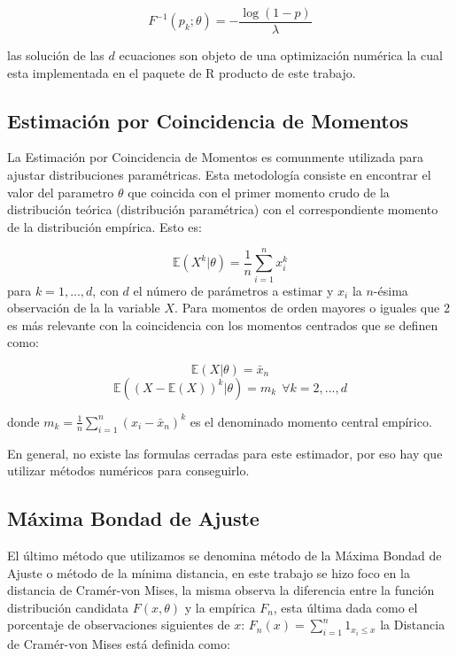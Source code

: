 \documentclass[10pt,]{article}
\begin{document}
\[F^{-1}(p_k;\theta)=-\frac{\log(1-p)}{\lambda}\]

las solución de las \(d\) ecuaciones son objeto de una optimización
numérica la cual esta implementada en el paquete de R producto de este
trabajo.

\hypertarget{estimacion-por-coincidencia-de-momentos}{%
\subsection{Estimación por Coincidencia de
Momentos}\label{estimacion-por-coincidencia-de-momentos}}

La Estimación por Coincidencia de Momentos es comunmente utilizada para
ajustar distribuciones paramétricas. Esta metodología consiste en
encontrar el valor del parametro \(\theta\) que coincida con el primer
momento crudo de la distribución teórica (distribución paramétrica) con
el correspondiente momento de la distribución empírica. Esto es:

\[\mathbb{E}(X^{k}|\theta)=\frac{1}{n}\sum_{i=1}^{n}x_{i}^{k}\] para
\(k=1,...,d\), con \(d\) el número de parámetros a estimar y \(x_i\) la
\(n\)-ésima observación de la la variable \(X\). Para momentos de orden
mayores o iguales que 2 es más relevante con la coincidencia con los
momentos centrados que se definen como:

\[\mathbb{E}(X|\theta)=\bar{x}_{n}\]
\[\mathbb{E}((X-\mathbb{E}(X))^{k}|\theta)=m_k~~\forall k=2,...,d\]

donde \(m_k=\frac{1}{n}\sum_{i=1}^{n}(x_i-\bar{x}_n)^k\) es el
denominado momento central empírico.

En general, no existe las formulas cerradas para este estimador, por eso
hay que utilizar métodos numéricos para conseguirlo.

\hypertarget{maxima-bondad-de-ajuste}{%
\subsection{Máxima Bondad de Ajuste}\label{maxima-bondad-de-ajuste}}

El último método que utilizamos se denomina método de la Máxima Bondad
de Ajuste o método de la mínima distancia, en este trabajo se hizo foco
en la distancia de Cramér-von Mises, la misma observa la diferencia
entre la función distribución candidata \(F(x,\theta)\) y la empírica
\(F_n\), esta última dada como el porcentaje de observaciones siguientes
de \(x\): \(F_n(x)=\sum_{i=1}^{n}1_{x_i\leq x}\) la Distancia de
Cramér-von Mises está definida como:
\end{document}
